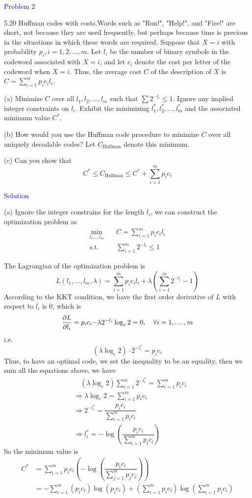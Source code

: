\textcolor{blue}{Problem 2}

5.20 Huffman codes with costs.\quad Words such as "Run!", "Help!", and "Fire!" are short, not because they are used frequently, but perhaps because time is precious in the situations in which these words are required. Suppose that $X=i$ with probability $p_i,i=1,2,\ldots,m$. Let $l_i$ be the number of binary symbols in the codeword associated with $X=i$, and let $c_i$ denote the cost per letter of the codeword when $X=i.$ Thus, the average cost $C$ of the description of $X$ is $C=\sum\limits_{i=1}^mp_ic_il_i$.

(a) Minimize $C$ over all $l_1,l_2,\ldots,l_m$ such that $\sum2^{-l_i}\leq 1$. Ignore any implied integer constraints on $l_i$. Exhibit the minimizing $l_1^*,l_2^*,\ldots,l_m^*$ and the associated minimum value $C^*$.

(b) How would you use the Huffman code procedure to minimize $C$ over all uniquely decodable codes? Let $C_{\text{Huffman}}$ denote this minimum.

(c) Can you show that
$$C^*\leq C_\text{Huffman}\leq C^*+\sum_{i=1}^mp_ic_i$$

\textcolor{blue}{Solution}

(a) Ignore the integer constrains for the length $l_i$, we can construct the optimization problem as
\begin{align*}
\min\limits_{l_1\ldots,l_m} \quad & C=\sum_{i=1}^mp_ic_il_i \\
\text{s.t.} \quad & \sum_{i=1}^m2^{-l_i}\leq 1
\end{align*}

The Lagrangian of the optimization problem is
$$L(l_1,\ldots,l_m,\lambda)=\sum_{i=1}^mp_ic_il_i+\lambda\left(\sum_{i=1}^m2^{-l_i}-1\right)$$
According to the KKT condition, we have the first order derivative of $L$ with respect to $l_i$ is $0$, which is
$$\dfrac{\partial L}{\partial l_i}=p_ic_i \textcolor{red}{-}\lambda2^{-l_i}\log_e 2=0,\quad\forall i=1,\ldots,m$$
i.e.
$$\left(\lambda\log_e2\right)\cdot 2^{-l_i^*}=p_ic_i$$
Thus, to have an optimal code, we set the inequality to be an equality, then we sum all the equations above, we have
\begin{align*}
&\quad \left(\lambda\log_e2\right)\sum_{i=1}^m2^{-l_i^*} = \sum_{i=1}^mp_ic_i \\
&\Rightarrow \lambda\log_e2 = \sum_{i=1}^mp_ic_i \\
&\Rightarrow 2^{-l_i^*} = \dfrac{p_ic_i}{\sum\limits_{i=1}^mp_ic_i} \\
&\Rightarrow l_i^* = -\log\left(\dfrac{p_ic_i}{\sum\limits_{i=1}^mp_ic_i}\right)
\end{align*}
So the minimum value is
\begin{align*}
C^* &= \sum_{i=1}^mp_ic_i\left(-\log\left(\dfrac{p_ic_i}{\sum\limits_{j=1}^mp_jc_j}\right)\right) \\
&= -\sum_{i=1}^m\left(p_ic_i\right)\log\left(p_ic_i\right) + \left(\sum_{i=1}^mp_ic_i\right)\log\left(\sum_{i=1}^mp_ic_i\right)
\end{align*}

